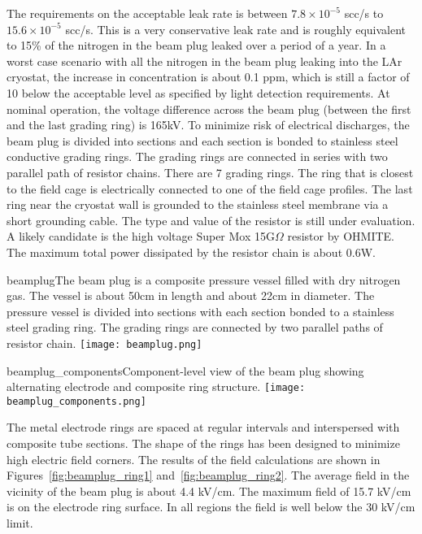 The requirements on the acceptable leak rate is between $7.8\times 10^{-5}$ scc/s to $15.6\times 10^{-5}$ scc/s. This is a very conservative leak rate and is roughly equivalent to 15\% of the nitrogen in the beam plug leaked over a period of a year.
  In a worst case scenario with all the nitrogen in the beam plug leaking into the LAr cryostat, the increase in concentration is about 0.1 ppm, which is still a factor of 10 below the acceptable level as specified by light detection requirements.
  At nominal operation, the voltage difference across the beam plug (between the first and the last grading ring) is 165kV. 
  To minimize risk of electrical discharges, the beam plug is divided into sections and each section is bonded to stainless steel conductive grading rings. The grading rings are connected in series with two parallel path of resistor chains. There are 7 grading rings. The ring that is closest to the field cage is electrically connected to one of the field cage profiles. 
  The last ring near the cryostat wall is grounded to the stainless steel membrane via a short grounding cable. 
  The type and value of the resistor is still under evaluation. A likely candidate is the high voltage Super Mox 15G$\Omega$ resistor by OHMITE. The maximum total power dissipated by the resistor chain is about 0.6W.


\begin{cdrfigure}{beamplug}{The beam plug is a  composite pressure vessel filled with dry nitrogen gas. The vessel is about 50cm in length and about 22cm in diameter. The pressure vessel is divided into sections with each section bonded to a stainless steel grading ring. The grading rings are connected by two parallel paths of resistor chain.}
  \texttt{[image: beamplug.png]}
\end{cdrfigure}

\begin{cdrfigure}{beamplug_components}{Component-level view of the beam plug showing alternating electrode and composite ring structure.}
  \texttt{[image: beamplug\_components.png]}
\end{cdrfigure}

The metal electrode rings are spaced at regular intervals and interspersed with composite tube sections. The shape of the rings has been designed to minimize high electric field corners. The results of the field calculations are shown in Figures~\ref{fig:beamplug_ring1} and~\ref{fig:beamplug_ring2}. The average field in the vicinity of the beam plug is about 4.4 kV/cm. The maximum field of 15.7 kV/cm is on the electrode ring surface. In all regions the field is well below the 30 kV/cm limit.

